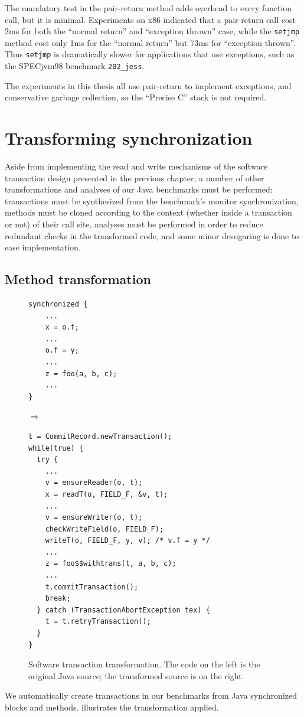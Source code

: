 The mandatory test in the pair-return method adds overhead to every
function call, but it is minimal.  Experiments on x86 indicated that
a pair-return call cost 2ms for both the ``normal return'' and
``exception thrown'' case, while the \texttt{setjmp} method cost only
1ms for the ``normal return'' but 73ms for ``exception thrown''.  Thus
\texttt{setjmp} is dramatically slower for applications that use
exceptions, such as the SPECjvm98 benchmark \texttt{202\_jess}.

The experiments in this thesis all use pair-return to implement
exceptions, and conservative garbage
collection, so the ``Precise C'' stack is not required.

\section{Transforming synchronization}\label{sec:synctrans}
Aside from implementing the read and write mechanisms of the software
transaction design presented in the previous chapter, a number of
other transformations and analyses of our Java benchmarks must be
performed: transactions must be synthesized from the benchmark's
monitor synchronization, methods must be cloned according to the
context (whether inside a transaction or not) of their call site,
analyses must be performed in order to reduce redundant checks in the
transformed code, and some minor desugaring is done to ease
implementation.

\subsection{Method transformation}
\begin{figure}\sis\fontsize{9}{10}
\begin{minipage}{1.5in}
\begin{verbatim}
synchronized {
    ...
    x = o.f;
    ...
    o.f = y;
    ...
    z = foo(a, b, c);
    ...
}
\end{verbatim}
\end{minipage}
$\Rightarrow\quad$
\begin{minipage}{3in}
\begin{verbatim}
t = CommitRecord.newTransaction();
while(true) {
  try {
    ...
    v = ensureReader(o, t);
    x = readT(o, FIELD_F, &v, t);
    ...
    v = ensureWriter(o, t);
    checkWriteField(o, FIELD_F);
    writeT(o, FIELD_F, y, v); /* v.f = y */
    ...
    z = foo$$withtrans(t, a, b, c);
    ...
    t.commitTransaction();
    break;
  } catch (TransactionAbortException tex) {
    t = t.retryTransaction();
  }
}
\end{verbatim}
\end{minipage}
\caption[Software transaction transformation.]
{Software transaction transformation.  The code on the left is the
  original Java source; the transformed source is on the right.}
\label{fig:synctrans}\end{figure}
We automatically create transactions in our benchmarks from
Java synchronized blocks and methods.   illustrates
the transformation applied.

